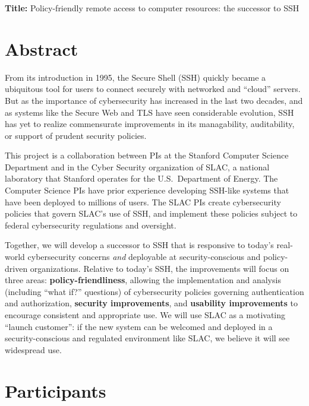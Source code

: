 \documentclass[11pt]{article}
\begin{document}
\noindent \textbf{Title:} Policy-friendly remote access to computer resources: the successor to SSH

\vspace{-.5\baselineskip}

\section*{Abstract}

From its introduction in 1995, the Secure Shell (SSH) quickly became a
ubiquitous tool for users to connect securely with networked and
``cloud'' servers. But as the importance of cybersecurity has
increased in the last two decades, and as systems like the Secure Web
and TLS have seen considerable evolution, SSH has yet to realize
commensurate improvements in its managability, auditability, or
support of prudent security policies.

This project is a collaboration between PIs at the Stanford Computer
Science Department and in the Cyber Security organization of SLAC, a
national laboratory that Stanford operates for the U.S.~Department of
Energy. The Computer Science PIs have prior experience developing
SSH-like systems that have been deployed to millions of users. The
SLAC PIs create cybersecurity policies that govern SLAC's use of SSH,
and implement these policies subject to federal cybersecurity regulations and oversight.

Together, we will develop a successor to SSH that is responsive to
today's real-world cybersecurity concerns \emph{and} deployable at
security-conscious and policy-driven organizations. Relative to
today's SSH, the improvements will focus on three areas:
\textbf{policy-friendliness}, allowing the implementation and analysis
(including ``what if?'' questions) of cybersecurity policies governing
authentication and authorization, \textbf{security improvements}, and
\textbf{usability improvements} to encourage consistent and
appropriate use. We will use SLAC as a motivating ``launch customer'':
if the new system can be welcomed and deployed in a security-conscious
and regulated environment like SLAC, we believe it will see widespread
use.

\vspace{-.5\baselineskip}

\section{Participants}
\end{document}
